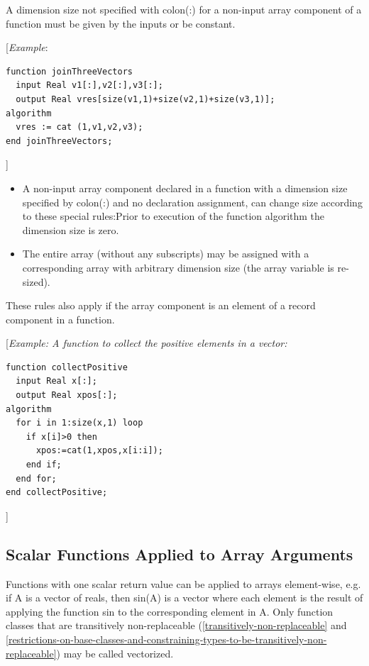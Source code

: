 \documentclass[10pt,a4paper]{report}
\def\doublelabel#1{\label{#1}\hypertarget{#1}{}}
\begin{document}
A dimension size not specified with colon(:) for a non-input array
component of a function must be given by the inputs or be constant.

{[}\emph{Example}:

\begin{lstlisting}[language=modelica]
function joinThreeVectors
  input Real v1[:],v2[:],v3[:];
  output Real vres[size(v1,1)+size(v2,1)+size(v3,1)];
algorithm
  vres := cat (1,v1,v2,v3);
end joinThreeVectors;
\end{lstlisting}
{]}

\begin{itemize}
\item
  A non-input array component declared in a function with a dimension
  size specified by colon(:) and no declaration assignment, can change
  size according to these special rules:Prior to execution of the
  function algorithm the dimension size is zero.
\item
  The entire array (without any subscripts) may be assigned with a
  corresponding array with arbitrary dimension size (the array variable
  is re-sized).
\end{itemize}

These rules also apply if the array component is an element of a record
component in a function.

{[}\emph{Example: A function to collect the positive elements in a
vector:}

\begin{lstlisting}[language=modelica]
function collectPositive
  input Real x[:];
  output Real xpos[:];
algorithm
  for i in 1:size(x,1) loop
    if x[i]>0 then
      xpos:=cat(1,xpos,x[i:i]);
    end if;
  end for;
end collectPositive;
\end{lstlisting}
{]}

\subsection{Scalar Functions Applied to Array Arguments}\doublelabel{scalar-functions-applied-to-array-arguments}

Functions with one scalar return value can be applied to arrays
element-wise, e.g. if A is a vector of reals, then sin(A) is a vector
where each element is the result of applying the function sin to the
corresponding element in A. Only function classes that are transitively
non-replaceable (\ref{transitively-non-replaceable} and \ref{restrictions-on-base-classes-and-constraining-types-to-be-transitively-non-replaceable}) may be called vectorized.
\end{document}
